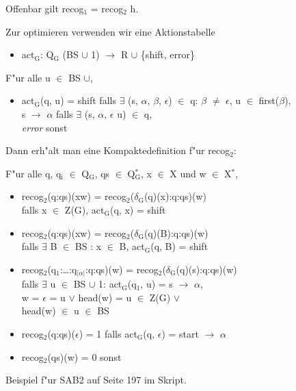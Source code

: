 \documentclass[11pt]{article}
\begin{document}
Offenbar gilt recog$_{\text{1}}$ = recog$_{\text{2}}$ \bigcirc h.

Zur optimieren verwenden wir eine Aktionstabelle 
\begin{itemize}
\item act$_{\text{G}}$: Q$_{\text{G}}$ \texttimes{} (BS $\cup$ 1) $\to$ R $\cup$ \{shift, error\}
\end{itemize}
F"ur alle u $\in$ BS $\cup$,

\begin{itemize}
\item act$_{\text{G}}$(q, u) = shift falls $\exists$ (s, $\alpha$, $\beta$, $\epsilon$) $\in$ q: $\beta$ $\neq$ $\epsilon$, u $\in$ first($\beta$), \\ s $\to$ $\alpha$ falls $\exists$ (s, $\alpha$, $\epsilon$ u) $\in$ q, \\ \emph{error} sonst
\end{itemize}

Dann erh"alt man eine Kompaktedefinition f"ur recog$_{\text{2}}$:

F"ur alle q, q$_{\text{i}}$ $\in$ Q$_{\text{G}}$, qs $\in$ Q$^{\text{*}}_{\text{G}}$, x $\in$ X und w $\in$ X$^{\text{*}}$,
\begin{itemize}
\item recog$_{\text{2}}$(q:qs)(xw) = recog$_{\text{2}}$($\delta$$_{\text{G}}$(q)(x):q:qs)(w) \\ falls x $\in$ Z(G), act$_{\text{G}}$(q, x) = shift
\item recog$_{\text{2}}$(q:qs)(xw) = recog$_{\text{2}}$($\delta$$_{\text{G}}$(q)(B):q:qs)(w) \\ falls $\exists$ B $\in$ BS : x $\in$ B, act$_{\text{G}}$(q, B) = shift
\item recog$_{\text{2}}$(q$_{\text{1}}$:\ldots{}:q$_{\text{|}\alpha\text{|}}$:q:qs)(w) = recog$_{\text{2}}$($\delta$$_{\text{G}}$(q)(s):q:qs)(w) \\ falls $\exists$ u $\in$ BS $\cup$ 1: act$_{\text{G}}$(q$_{\text{1}}$, u) = s $\to$ $\alpha$,\\ w = $\epsilon$ = u $\lor$ head(w) = u $\in$ Z(G) $\lor$ \\ head(w) $\in$ u $\in$ BS
\item recog$_{\text{2}}$(q:qs)($\epsilon$) = 1 falls act$_{\text{G}}$(q, $\epsilon$) = start $\to$ $\alpha$
\item recog$_{\text{2}}$(qs)(w) = 0 sonst
\end{itemize}

Beispiel f"ur SAB2 auf Seite 197 im Skript.
\end{document}
